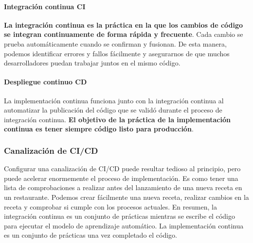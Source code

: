 \documentclass[10pt]{book}
\begin{document}
\paragraph{Integración continua CI}
\textbf{La integración continua es la práctica en la que los cambios de código se integran continuamente de forma rápida y frecuente}. Cada cambio se prueba automáticamente cuando se confirman y fusionan. De esta manera, podemos identificar errores y fallos fácilmente y asegurarnos de que muchos desarrolladores puedan trabajar juntos en el mismo código.

\paragraph{Despliegue continuo CD}
La implementación continua funciona junto con la integración continua al automatizar la publicación del código que se validó durante el proceso de integración continua. \textbf{El objetivo de la práctica de la implementación continua es tener siempre código listo para producción}.

\subsubsection{Canalización de CI/CD}
Configurar una canalización de CI/CD puede resultar tedioso al principio, pero puede acelerar enormemente el proceso de implementación. Es como tener una lista de comprobaciones a realizar antes del lanzamiento de una nueva receta en un restaurante. Podemos crear fácilmente una nueva receta, realizar cambios en la receta y comprobar si cumple con los procesos actuales. En resumen, la integración continua es un conjunto de prácticas mientras se escribe el código para ejecutar el modelo de aprendizaje automático. La implementación continua es un conjunto de prácticas una vez completado el código.
\end{document}
